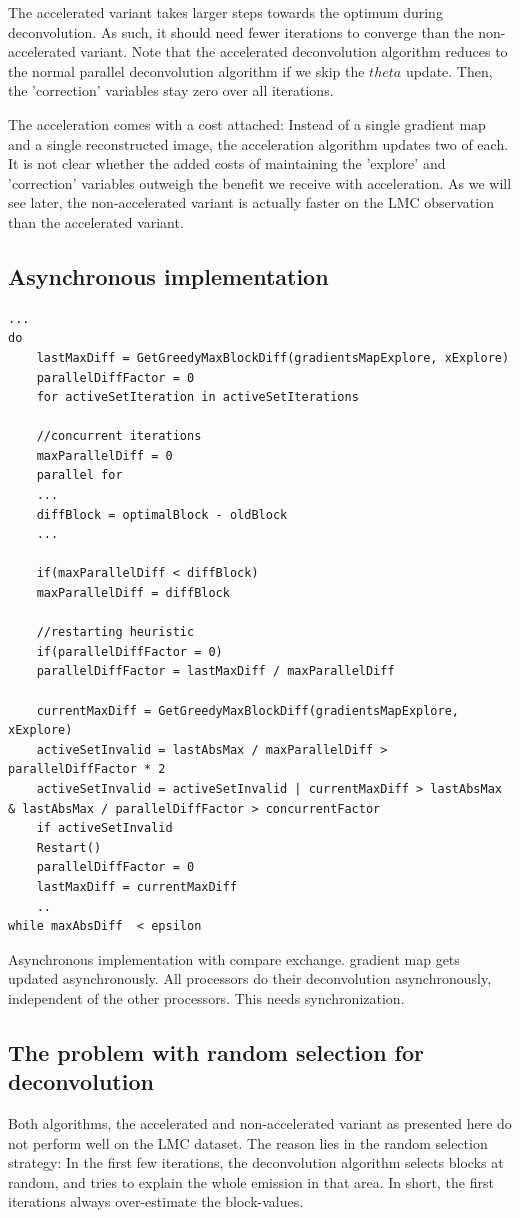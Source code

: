 The accelerated variant takes larger steps towards the optimum during deconvolution. As such, it should need fewer iterations to converge than the non-accelerated variant. Note that the accelerated deconvolution algorithm reduces to the normal parallel deconvolution algorithm if we skip the $theta$ update. Then, the 'correction' variables stay zero over all iterations.

The acceleration comes with a cost attached: Instead of a single gradient map and a single reconstructed image, the acceleration algorithm updates two of each. It is not clear whether the added costs of maintaining the 'explore' and 'correction' variables outweigh the benefit we receive with acceleration. As we will see later, the non-accelerated variant is actually faster on the LMC observation than the accelerated variant.

\subsection{Asynchronous implementation}

\begin{lstlisting}
...
do
	lastMaxDiff = GetGreedyMaxBlockDiff(gradientsMapExplore, xExplore)
	parallelDiffFactor = 0
	for activeSetIteration in activeSetIterations
	
	//concurrent iterations
	maxParallelDiff = 0
	parallel for
	...
	diffBlock = optimalBlock - oldBlock
	...
	
	if(maxParallelDiff < diffBlock)
	maxParallelDiff = diffBlock
	
	//restarting heuristic
	if(parallelDiffFactor = 0)
	parallelDiffFactor = lastMaxDiff / maxParallelDiff
	
	currentMaxDiff = GetGreedyMaxBlockDiff(gradientsMapExplore, xExplore)
	activeSetInvalid = lastAbsMax / maxParallelDiff > parallelDiffFactor * 2
	activeSetInvalid = activeSetInvalid | currentMaxDiff > lastAbsMax & lastAbsMax / parallelDiffFactor > concurrentFactor
	if activeSetInvalid
	Restart()
	parallelDiffFactor = 0
	lastMaxDiff = currentMaxDiff
	..
while maxAbsDiff  < epsilon
\end{lstlisting}



Asynchronous implementation with compare exchange. gradient map gets updated asynchronously.
All processors do their deconvolution asynchronously, independent of the other processors. This needs synchronization.

\subsection{The problem with random selection for deconvolution} \label{pcdm:adaption}
Both algorithms, the accelerated and non-accelerated variant as presented here do not perform well on the LMC dataset. The reason lies in the random selection strategy: In the first few iterations, the deconvolution algorithm selects blocks at random, and tries to explain the whole emission in that area. In short, the first iterations always over-estimate the block-values. 

